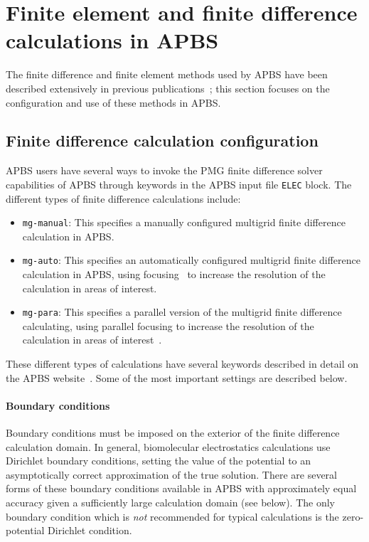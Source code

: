 \documentclass[12pt,titlepage]{article}
\newcommand{\keyword}[1]{\texttt{#1}}
\begin{document}
\section{Finite element and finite difference calculations in APBS} \label{app:fd}
The finite difference and finite element methods used by APBS have been described extensively in previous publications~\cite{Baker2000, Holst2000, Holst1993, Baker2001, Baker2001a}; this section focuses on the configuration and use of these methods in APBS.

\subsection{Finite difference calculation configuration} \label{sec:fd-config}
APBS users have several ways to invoke the PMG finite difference solver~\cite{Holst1993} capabilities of APBS through keywords in the APBS input file \keyword{ELEC} block.
The different types of finite difference calculations include:
\begin{itemize}
	\item \keyword{mg-manual}: This specifies a manually configured multigrid finite difference calculation in APBS.
	\item \keyword{mg-auto}: This specifies an automatically configured multigrid finite difference calculation in APBS, using focusing~\cite{Gilson1988} to increase the resolution of the calculation in areas of interest.
	\item \keyword{mg-para}:  This specifies a parallel version of the multigrid finite difference calculating, using parallel focusing to increase the resolution of the calculation in areas of interest~\cite{Baker2001a}.
\end{itemize}
These different types of calculations have several keywords described in detail on the APBS website~\cite{APBSweb}.
Some of the most important settings are described below.

\paragraph{Boundary conditions}
Boundary conditions must be imposed on the exterior of the finite difference calculation domain.
In general, biomolecular electrostatics calculations use Dirichlet boundary conditions, setting the value of the potential to an asymptotically correct approximation of the true solution.
There are several forms of these boundary conditions available in APBS with approximately equal accuracy given a sufficiently large calculation domain (see below).
The only boundary condition which is \emph{not} recommended for typical calculations is the zero-potential Dirichlet condition.
\end{document}
